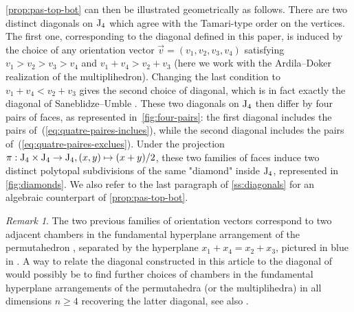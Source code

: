 \documentclass[10pt]{amsart}
\theoremstyle{remark}
\newtheorem{remark}[definition]{\sc Remark}
\begin{document}
\cref{prop:pas-top-bot} can then be illustrated geometrically as follows. 
There are two distinct diagonals on $\mathrm{J}_4$ which agree with the Tamari-type order on the vertices. 
The first one, corresponding to the diagonal defined in this paper, is induced by the choice of any orientation vector $\vec v=(v_1,v_2,v_3,v_4)$ satisfying $v_1>v_2>v_3>v_4$ and $v_1 + v_4 > v_2+v_3$ (here we work with the Ardila--Doker realization of the multiplihedron).
Changing the last condition to $v_1 + v_4 < v_2+v_3$ gives the second choice of diagonal, which is in fact exactly the diagonal of Saneblidze--Umble \cite[Section 5]{SaneblidzeUmble04}. 
These two diagonals on $\mathrm{J}_4$ then differ by four pairs of faces, as represented in~\cref{fig:four-pairs}: the first diagonal includes the pairs of~(\ref{eq:quatre-paires-inclues}), while the second diagonal includes the pairs of~(\ref{eq:quatre-paires-exclues}).
Under the projection $\pi : \mathrm{J}_4 \times \mathrm{J}_4 \to \mathrm{J}_4, (x,y) \mapsto (x+y)/2$, these two families of faces induce two distinct polytopal subdivisions of the same "diamond" inside $\mathrm{J}_4$, represented in \cref{fig:diamonds}. 
We also refer to the last paragraph of \cref{ss:diagonals} for an algebraic counterpart of \cref{prop:pas-top-bot}.

\begin{remark}
  The two previous families of orientation vectors correspond to two adjacent chambers in the fundamental hyperplane arrangement of the permutahedron \cite[Theorem 3.6]{LA21}, separated by the hyperplane $x_1+x_4=x_2+x_3$, pictured in blue in \cite[Figure 12]{LA21}.
  A way to relate the diagonal constructed in this article to the diagonal of \cite[Section 5]{SaneblidzeUmble04} would possibly be to find further choices of chambers in the fundamental hyperplane arrangements of the permutahedra (or the multiplihedra) in all dimensions $n \geq 4$ recovering the latter diagonal, see also \cite[Remark~3.19]{LA21}.
\end{remark}
\end{document}
